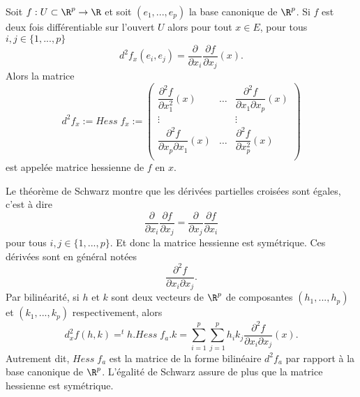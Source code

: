 \documentclass[12pt, class=report,crop=false]{standalone}
\begin{document}
\begin{definition}
\textcolor[rgb]{0.73,0.00,0.00}{
  Soit $f: U \subset \R^p \rightarrow \R$ et soit $(e_1,...,e_p)$ la base canonique de $\R^p$.
  Si $f$ est deux fois diff\'erentiable sur l'ouvert $U$ alors pour tout $x \in E$, pour tous $i,j \in \{1,...,p\}$
  \begin{equation*}
    d^2f_x(e_i,e_j)=\dfrac{\partial}{\partial x_i}\dfrac{\partial f}{\partial x_j}(x).
  \end{equation*}
  Alors la matrice
  \begin{equation*}
    d^2f_x:=Hess \;f_x:=\left(
                          \begin{array}{ccc}
                            \dfrac{\partial^2 f}{\partial x_1^2}(x) & \ldots &  \dfrac{\partial^2 f}{\partial x_1 \partial x_p}(x) \\
                            \vdots &  & \vdots \\
                            \dfrac{\partial^2 f}{\partial x_p \partial x_1}(x) & \ldots &  \dfrac{\partial^2 f}{\partial x_p^2}(x) \\
                          \end{array}
                        \right)
  \end{equation*}
  est appel\'ee matrice hessienne de $f$ en $x$.}
\end{definition}
\noindent Le th\'eor\`eme de Schwarz montre que les d\'eriv\'ees partielles crois\'ees sont \'egales, c'est \`a dire
\begin{equation*}
  \dfrac{\partial}{\partial x_i}\dfrac{\partial f}{\partial x_j}=\dfrac{\partial}{\partial x_j}\dfrac{\partial f}{\partial x_i}
\end{equation*}
pour tous $i,j \in \{1,...,p\}$. Et donc la matrice hessienne est sym\'etrique. Ces d\'eriv\'ees sont en g\'en\'eral not\'ees
\begin{equation*}
  \dfrac{\partial^2 f}{\partial x_i \partial x_j}.
\end{equation*}
Par bilin\'earit\'e, si $h$ et $k$ sont deux vecteurs de $\R^p$ de composantes $(h_1,...,h_p)$ et $(k_1,...,k_p)$
respectivement, alors
\begin{equation*}
  d^2_xf(h,k)= ^th. Hess \; f_a.k=\displaystyle \sum_{i=1}^p  \displaystyle \sum_{j=1}^p h_ik_j   \dfrac{\partial^2 f}{\partial x_i \partial x_j}(x).
\end{equation*}
Autrement dit, $Hess \; f_a$ est la matrice de la forme bilin\'eaire $d^2f_a$ par rapport
\`a la base canonique de $\R^p$. L'\'egalit\'e de Schwarz assure de plus que la matrice hessienne est sym\'etrique.
\end{document}
